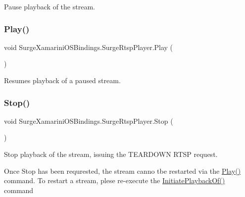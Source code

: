 Pause playback of the stream. 

\mbox{\label{interface_surge_xamarini_o_s_bindings_1_1_surge_rtsp_player_a3f7d8277f7aa65454732afd623ee53af}} 
\subsubsection{\texorpdfstring{Play()}{Play()}}
{\footnotesize\ttfamily void Surge\+Xamarini\+O\+S\+Bindings.\+Surge\+Rtsp\+Player.\+Play (\begin{DoxyParamCaption}{ }\end{DoxyParamCaption})}



Resumes playback of a paused stream. 

\mbox{\label{interface_surge_xamarini_o_s_bindings_1_1_surge_rtsp_player_ac4cb8b34437ee896e4529cddca339bed}} 
\subsubsection{\texorpdfstring{Stop()}{Stop()}}
{\footnotesize\ttfamily void Surge\+Xamarini\+O\+S\+Bindings.\+Surge\+Rtsp\+Player.\+Stop (\begin{DoxyParamCaption}{ }\end{DoxyParamCaption})}



Stop playback of the stream, issuing the T\+E\+A\+R\+D\+O\+WN R\+T\+SP request. 

Once Stop has been requrested, the stream canno tbe restarted via the \hyperlink{interface_surge_xamarini_o_s_bindings_1_1_surge_rtsp_player_a3f7d8277f7aa65454732afd623ee53af}{Play()} command. To restart a stream, plese re-\/execute the \hyperlink{interface_surge_xamarini_o_s_bindings_1_1_surge_rtsp_player_a7c2572b559c1758415a21c0bde4417be}{Initiate\+Playback\+Of()} command 

